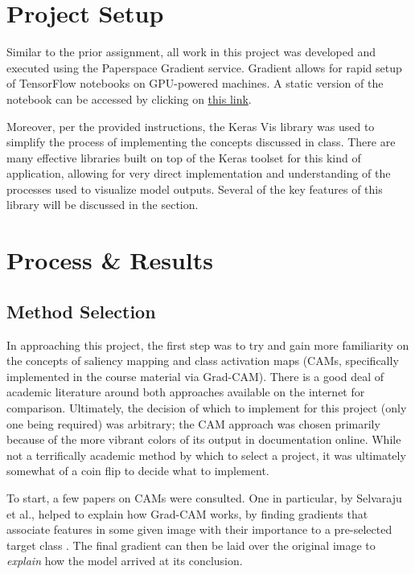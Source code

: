 \documentclass{article}
\begin{document}
  
  \graphicspath{{./images/}}

\section{Project Setup}
\par Similar to the prior assignment, all work in this project was developed and executed using the Paperspace Gradient service.
Gradient allows for rapid setup of TensorFlow notebooks on GPU-powered machines.
A static version of the notebook can be accessed by clicking on \href{https://console.paperspace.com/te7vzjiu3/notebook/pr4zcy28o}{this link}.
\par Moreover, per the provided instructions, the Keras Vis library was used to simplify the process of implementing the concepts discussed in class.
There are many effective libraries built on top of the Keras toolset for this kind of application, allowing for very direct implementation and understanding of the processes used to visualize model outputs.
Several of the key features of this library will be discussed in the  section.

\section{Process \& Results}
\subsection{Method Selection}
In approaching this project, the first step was to try and gain more familiarity on the concepts of saliency mapping and class activation maps (CAMs, specifically implemented in the course material via Grad-CAM).
There is a good deal of academic literature around both approaches available on the internet for comparison.
Ultimately, the decision of which to implement for this project (only one being required) was arbitrary; the CAM approach was chosen primarily because of the more vibrant colors of its output in documentation online.
While not a terrifically academic method by which to select a project, it was ultimately somewhat of a coin flip to decide what to implement.

\par To start, a few papers on CAMs were consulted. One in particular, by Selvaraju et al., helped to explain how Grad-CAM works, by finding gradients that associate features in some given image with their importance to a pre-selected target class \cite{Selvaraju2020}.
The final gradient can then be laid over the original image to \textit{explain} how the model arrived at its conclusion.
\end{document}
